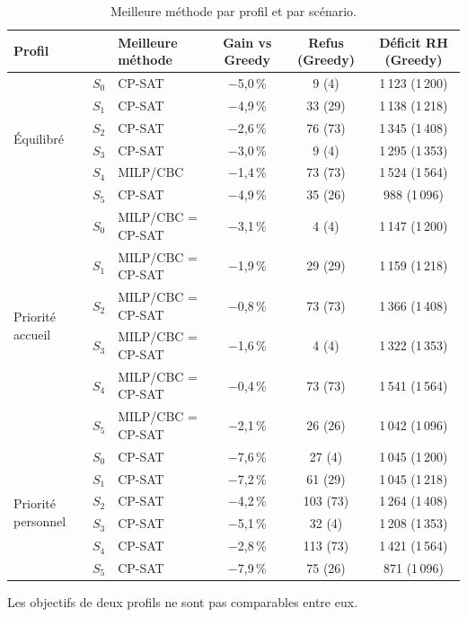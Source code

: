 \begin{table}[H]
    \centering
    \caption{Meilleure méthode par profil et par scénario.}
    \label{tab:meilleures_methodes}
    \small
    \begin{tabular}{lclccc}
        \toprule
        \textbf{Profil} &  & \textbf{Meilleure méthode} & \textbf{Gain vs Greedy} & \textbf{Refus (Greedy)} & \textbf{Déficit RH (Greedy)} \\
        \midrule
        \multirow{6}{*}{Équilibré} & $S_0$ & CP-SAT & $-$5{,}0\,\% & 9 (4) & 1\,123 (1\,200) \\
         & $S_1$ & CP-SAT & $-$4{,}9\,\% & 33 (29) & 1\,138 (1\,218) \\
         & $S_2$ & CP-SAT & $-$2{,}6\,\% & 76 (73) & 1\,345 (1\,408) \\
         & $S_3$ & CP-SAT & $-$3{,}0\,\% & 9 (4) & 1\,295 (1\,353) \\
         & $S_4$ & MILP/CBC & $-$1{,}4\,\% & 73 (73) & 1\,524 (1\,564) \\
         & $S_5$ & CP-SAT & $-$4{,}9\,\% & 35 (26) & 988 (1\,096) \\
        \midrule
        \multirow{6}{*}{Priorité accueil} & $S_0$ & MILP/CBC = CP-SAT & $-$3{,}1\,\% & 4 (4) & 1\,147 (1\,200) \\
         & $S_1$ & MILP/CBC = CP-SAT & $-$1{,}9\,\% & 29 (29) & 1\,159 (1\,218) \\
         & $S_2$ & MILP/CBC = CP-SAT & $-$0{,}8\,\% & 73 (73) & 1\,366 (1\,408) \\
         & $S_3$ & MILP/CBC = CP-SAT & $-$1{,}6\,\% & 4 (4) & 1\,322 (1\,353) \\
         & $S_4$ & MILP/CBC = CP-SAT & $-$0{,}4\,\% & 73 (73) & 1\,541 (1\,564) \\
         & $S_5$ & MILP/CBC = CP-SAT & $-$2{,}1\,\% & 26 (26) & 1\,042 (1\,096) \\
        \midrule
        \multirow{6}{*}{Priorité personnel} & $S_0$ & CP-SAT & $-$7{,}6\,\% & 27 (4) & 1\,045 (1\,200) \\
         & $S_1$ & CP-SAT & $-$7{,}2\,\% & 61 (29) & 1\,045 (1\,218) \\
         & $S_2$ & CP-SAT & $-$4{,}2\,\% & 103 (73) & 1\,264 (1\,408) \\
         & $S_3$ & CP-SAT & $-$5{,}1\,\% & 32 (4) & 1\,208 (1\,353) \\
         & $S_4$ & CP-SAT & $-$2{,}8\,\% & 113 (73) & 1\,421 (1\,564) \\
         & $S_5$ & CP-SAT & $-$7{,}9\,\% & 75 (26) & 871 (1\,096) \\
        \bottomrule
    \end{tabular}
    \par\vspace{3pt}
    {\footnotesize Les objectifs de deux profils ne sont pas comparables entre eux.}
\end{table}
